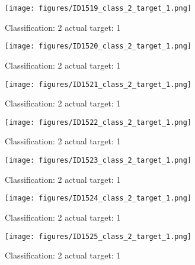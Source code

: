 \begin{figure}[h!]
\begin{center}
\texttt{[image: figures/ID1519\_class\_2\_target\_1.png]}
\end{center}
\caption{ Classification: 2 actual target: 1}
\label{fig:ID1519_class_2_target_1}
\end{figure}
\begin{figure}[h!]
\begin{center}
\texttt{[image: figures/ID1520\_class\_2\_target\_1.png]}
\end{center}
\caption{ Classification: 2 actual target: 1}
\label{fig:ID1520_class_2_target_1}
\end{figure}
\begin{figure}[h!]
\begin{center}
\texttt{[image: figures/ID1521\_class\_2\_target\_1.png]}
\end{center}
\caption{ Classification: 2 actual target: 1}
\label{fig:ID1521_class_2_target_1}
\end{figure}
\begin{figure}[h!]
\begin{center}
\texttt{[image: figures/ID1522\_class\_2\_target\_1.png]}
\end{center}
\caption{ Classification: 2 actual target: 1}
\label{fig:ID1522_class_2_target_1}
\end{figure}
\begin{figure}[h!]
\begin{center}
\texttt{[image: figures/ID1523\_class\_2\_target\_1.png]}
\end{center}
\caption{ Classification: 2 actual target: 1}
\label{fig:ID1523_class_2_target_1}
\end{figure}
\begin{figure}[h!]
\begin{center}
\texttt{[image: figures/ID1524\_class\_2\_target\_1.png]}
\end{center}
\caption{ Classification: 2 actual target: 1}
\label{fig:ID1524_class_2_target_1}
\end{figure}
\begin{figure}[h!]
\begin{center}
\texttt{[image: figures/ID1525\_class\_2\_target\_1.png]}
\end{center}
\caption{ Classification: 2 actual target: 1}
\label{fig:ID1525_class_2_target_1}
\end{figure}
